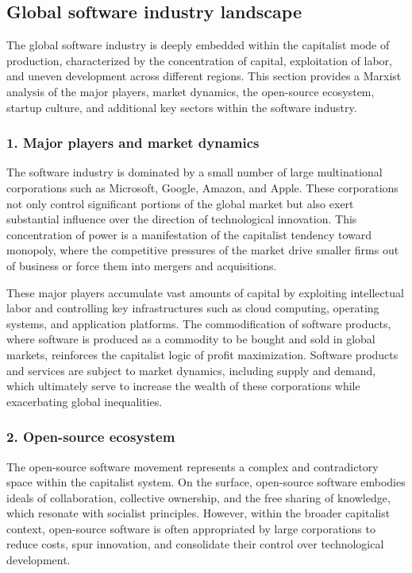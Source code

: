 \begin{refsection}
\begin{multicols}{2}
\subsection{Global software industry landscape}
{\small
The global software industry is deeply embedded within the capitalist mode of production, characterized by the concentration of capital, exploitation of labor, and uneven development across different regions. This section provides a Marxist analysis of the major players, market dynamics, the open-source ecosystem, startup culture, and additional key sectors within the software industry.

\subsubsection*{1. Major players and market dynamics}

The software industry is dominated by a small number of large multinational corporations such as Microsoft, Google, Amazon, and Apple. These corporations not only control significant portions of the global market but also exert substantial influence over the direction of technological innovation. This concentration of power is a manifestation of the capitalist tendency toward monopoly, where the competitive pressures of the market drive smaller firms out of business or force them into mergers and acquisitions.

These major players accumulate vast amounts of capital by exploiting intellectual labor and controlling key infrastructures such as cloud computing, operating systems, and application platforms. The commodification of software products, where software is produced as a commodity to be bought and sold in global markets, reinforces the capitalist logic of profit maximization. Software products and services are subject to market dynamics, including supply and demand, which ultimately serve to increase the wealth of these corporations while exacerbating global inequalities.

\subsubsection*{2. Open-source ecosystem}

The open-source software movement represents a complex and contradictory space within the capitalist system. On the surface, open-source software embodies ideals of collaboration, collective ownership, and the free sharing of knowledge, which resonate with socialist principles. However, within the broader capitalist context, open-source software is often appropriated by large corporations to reduce costs, spur innovation, and consolidate their control over technological development.

}
\end{multicols}
\end{refsection}
